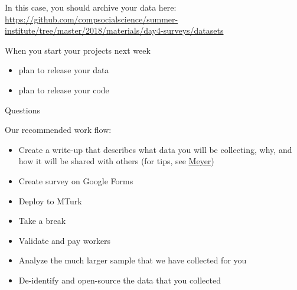 \documentclass[aspectratio=169]{beamer}
\begin{document}
\begin{frame}

In this case, you should archive your data here:\\
\url{https://github.com/compsocialscience/summer-institute/tree/master/2018/materials/day4-surveys/datasets}

\end{frame}
\begin{frame}

When you start your projects next week
\begin{itemize}
\item plan to release your data
\item plan to release your code
\end{itemize}

\end{frame}
\begin{frame}

\begin{center}
\LARGE Questions
\end{center}

\end{frame}
\begin{frame}

Our recommended work flow:
\begin{itemize}
\item Create a write-up that describes what data you will be collecting, why, and how it will be shared with others (for tips, see \href{https://doi.org/10.1177/2515245917747656}{Meyer})
\item Create survey on Google Forms
\item Deploy to MTurk
\item Take a break
\item Validate and pay workers
\item Analyze the much larger sample that we have collected for you
\item De-identify and open-source the data that you collected
\end{itemize}

\end{frame}
\end{document}
